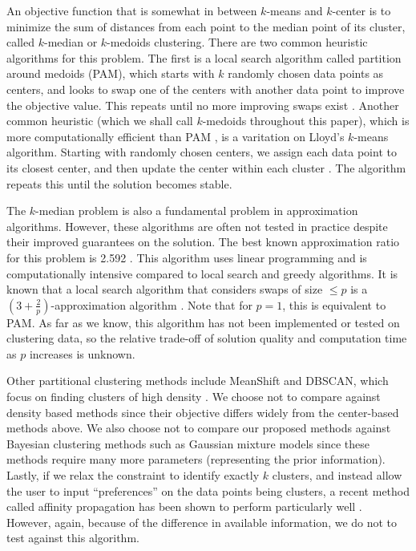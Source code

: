 \documentclass{article}
\begin{document}
An objective function that is somewhat in between $k$-means and $k$-center is to minimize the sum of distances from each point to the median point of its cluster, called $k$-median or $k$-medoids clustering.  There are two common heuristic algorithms for this problem. The first is a local search algorithm called partition around medoids (PAM), which starts with $k$ randomly chosen data points as centers, and looks to swap one of the centers with another data point to improve the objective value.  This repeats until no more improving swaps exist \cite{ESL}. 
Another common heuristic (which we shall call $k$-medoids throughout this paper), which is more computationally efficient than PAM \cite{Park}, is a varitation on Lloyd's $k$-means algorithm.  Starting with randomly chosen centers, we assign each data point to its closest center, and then update the center within each cluster \cite{Park}. The algorithm repeats this until the solution becomes stable.

The $k$-median problem is also a fundamental problem in approximation algorithms. However, these algorithms are often not tested in practice despite their improved guarantees on the solution. The best known approximation ratio for this problem is 2.592 \cite{Wu}. This algorithm uses linear programming and is computationally intensive compared to local search and greedy algorithms.  It is known that a local search algorithm that considers swaps of size $\leq p$ is a $(3 + \frac{2}{p})$-approximation algorithm \cite{Arya}. Note that for $p=1$, this is equivalent to PAM.  As far as we know, this algorithm has not been implemented or tested on clustering data, so the relative trade-off of solution quality and computation time as $p$ increases is unknown.

Other partitional clustering methods include MeanShift and DBSCAN, which focus on finding clusters of high density \cite{Comaniciu, Ester}. We choose not to compare against density based methods since their objective differs widely from the center-based methods above. We also choose not to compare our proposed methods against Bayesian clustering methods such as Gaussian mixture models since these methods require many more parameters (representing the prior information).  Lastly, if we relax the constraint to identify exactly $k$ clusters, and instead allow the user to input ``preferences'' on the data points being clusters, a recent method called affinity propagation has been shown to perform particularly well \cite{Frey}.  However, again, because of the difference in available information, we do not to test against this algorithm.  
\end{document}
